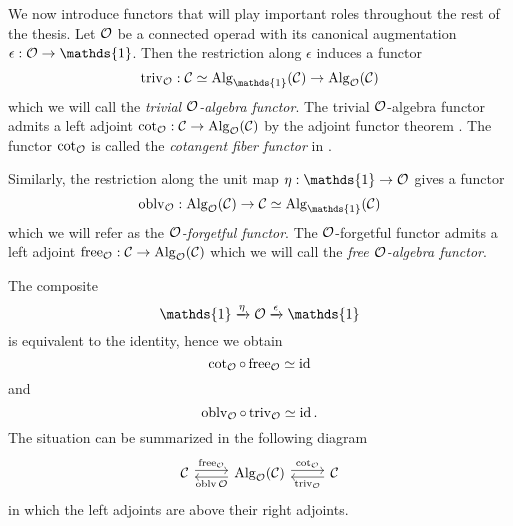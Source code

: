 We now introduce functors that will play important roles throughout the rest of the thesis. 
Let ${\mathcal{O}}$ be a connected operad with its canonical augmentation $\epsilon:\CO\rightarrow \mathds{1}$.
Then the restriction along $\epsilon$ induces a functor 
$$
\trivial_{\CO}: \CC\simeq\Alg_{\mathds{1}}(\CC)\rightarrow \Alg_{\CO}(\CC)
$$
which we will call the \emph{trivial ${\mathcal{O}}$-algebra functor}.
The trivial ${\mathcal{O}}$-algebra functor admits a left adjoint $\cot_{{\mathcal{O}}}:{\mathcal{C}}\rightarrow \operatorname{Alg}_{{\mathcal{O}}}({\mathcal{C}})$ by the adjoint functor theorem \cite[Corollary 5.5.2.9.]{HTT}. The functor $\cot_{{\mathcal{O}}}$ is called the \emph{cotangent fiber functor} in \cite{Heuts_Koszul}.

Similarly, the restriction along the unit map $\eta:\mathds{1}\rightarrow \CO$ gives a functor
$$
\oblv_{\CO}: \Alg_{\CO}(\CC)
\rightarrow 
\CC\simeq\Alg_{\mathds{1}}(\CC)$$
which we will refer as the \emph{${\mathcal{O}}$-forgetful functor}.
The ${\mathcal{O}}$-forgetful functor admits a left adjoint $\operatorname{free}_{{\mathcal{O}}}:{\mathcal{C}}\rightarrow \operatorname{Alg}_{{\mathcal{O}}}({\mathcal{C}})$ which we will call the \emph{free ${\mathcal{O}}$-algebra functor}.
    
The composite
$$
\mathds{1}\xrightarrow{\eta} \CO \xrightarrow{\epsilon} \mathds{1}
$$
is equivalent to the identity, hence we obtain
$$
\cot_{{\mathcal{O}}} \circ \operatorname{free}_{{\mathcal{O}}} \simeq \operatorname{id}
$$
and 
$$
\operatorname{oblv}_{{\mathcal{O}}}\circ \operatorname{triv}_{{\mathcal{O}}} \simeq \operatorname{id}.
$$
The situation can be summarized in the following diagram
\[
\begin{tikzcd}
\CC & \Alg_{\CO}(\CC) & \CC
	\arrow[from=1-1, to= 1-2, shift left = 1, "\Free_{\CO}" above]
	\arrow[from=1-2, to=1-1, shift left = 1, "\oblv{\CO}" below]
	\arrow[from=1-2, to= 1-3, shift left = 1, "\cot_{\CO}" above]
	\arrow[from=1-3, to=1-2, shift left = 1, "\trivial_{\CO}" below]
\end{tikzcd}
\]
in which the left adjoints are above their right adjoints.


